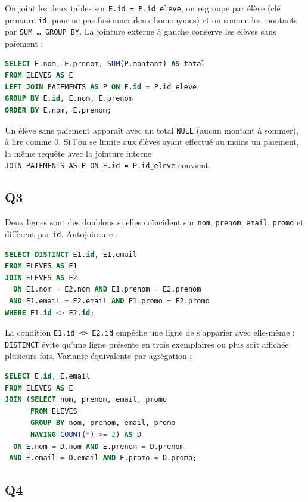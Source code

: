 \documentclass[11pt,a4paper]{article}
\begin{document}
On joint les deux tables sur \texttt{E.id\ =\allowbreak{}\ P.id\_eleve}, on regroupe par élève (clé primaire \texttt{id}, pour ne pas fusionner deux homonymes) et on somme les montants par \texttt{SUM\ …\ GROUP\ BY}. La jointure externe à gauche conserve les élèves sans paiement :

\begin{lstlisting}[language=SQL]
SELECT E.nom, E.prenom, SUM(P.montant) AS total
FROM ELEVES AS E
LEFT JOIN PAIEMENTS AS P ON E.id = P.id_eleve
GROUP BY E.id, E.nom, E.prenom
ORDER BY E.nom, E.prenom;
\end{lstlisting}

Un élève sans paiement apparaît avec un total \texttt{NULL} (aucun montant à sommer), à lire comme 0. Si l'on se limite aux élèves ayant effectué au moins un paiement, la même requête avec la jointure interne \texttt{JOIN\ PAIEMENTS\ AS\ P\ ON\ E.id\ =\allowbreak{}\ P.id\_eleve} convient.

\hypertarget{q3}{%
\subsection{Q3}\label{q3}}

Deux lignes sont des doublons si elles coïncident sur \texttt{nom}, \texttt{prenom}, \texttt{email}, \texttt{promo} et diffèrent par \texttt{id}. Autojointure :

\begin{lstlisting}[language=SQL]
SELECT DISTINCT E1.id, E1.email
FROM ELEVES AS E1
JOIN ELEVES AS E2
  ON E1.nom = E2.nom AND E1.prenom = E2.prenom
 AND E1.email = E2.email AND E1.promo = E2.promo
WHERE E1.id <> E2.id;
\end{lstlisting}

La condition \texttt{E1.id\ \textless{}\textgreater{}\ E2.id} empêche une ligne de s'apparier avec elle-même ; \texttt{DISTINCT} évite qu'une ligne présente en trois exemplaires ou plus soit affichée plusieurs fois. Variante équivalente par agrégation :

\begin{lstlisting}[language=SQL]
SELECT E.id, E.email
FROM ELEVES AS E
JOIN (SELECT nom, prenom, email, promo
      FROM ELEVES
      GROUP BY nom, prenom, email, promo
      HAVING COUNT(*) >= 2) AS D
  ON E.nom = D.nom AND E.prenom = D.prenom
 AND E.email = D.email AND E.promo = D.promo;
\end{lstlisting}

\hypertarget{q4}{%
\subsection{Q4}\label{q4}}
\end{document}
